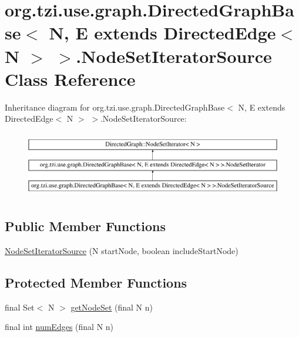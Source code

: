 \hypertarget{classorg_1_1tzi_1_1use_1_1graph_1_1_directed_graph_base_3_01_n_00_01_e_01extends_01_directed_edg13245e53183027847904400cecaf7471}{\section{org.\-tzi.\-use.\-graph.\-Directed\-Graph\-Base$<$ N, E extends Directed\-Edge$<$ N $>$ $>$.Node\-Set\-Iterator\-Source Class Reference}
\label{classorg_1_1tzi_1_1use_1_1graph_1_1_directed_graph_base_3_01_n_00_01_e_01extends_01_directed_edg13245e53183027847904400cecaf7471}
}
Inheritance diagram for org.\-tzi.\-use.\-graph.\-Directed\-Graph\-Base$<$ N, E extends Directed\-Edge$<$ N $>$ $>$.Node\-Set\-Iterator\-Source\-:\begin{figure}[H]
\begin{center}
\leavevmode
\includegraphics[height=2.911612cm]{classorg_1_1tzi_1_1use_1_1graph_1_1_directed_graph_base_3_01_n_00_01_e_01extends_01_directed_edg13245e53183027847904400cecaf7471}
\end{center}
\end{figure}
\subsection*{Public Member Functions}
\begin{DoxyCompactItemize}
\item 
\hyperlink{classorg_1_1tzi_1_1use_1_1graph_1_1_directed_graph_base_3_01_n_00_01_e_01extends_01_directed_edg13245e53183027847904400cecaf7471_a61f16cd077c0a82c90a4c4492294d97b}{Node\-Set\-Iterator\-Source} (N start\-Node, boolean include\-Start\-Node)
\end{DoxyCompactItemize}
\subsection*{Protected Member Functions}
\begin{DoxyCompactItemize}
\item 
final Set$<$ N $>$ \hyperlink{classorg_1_1tzi_1_1use_1_1graph_1_1_directed_graph_base_3_01_n_00_01_e_01extends_01_directed_edg13245e53183027847904400cecaf7471_ac4de39f10339f404d2b639bd019da391}{get\-Node\-Set} (final N n)
\item 
final int \hyperlink{classorg_1_1tzi_1_1use_1_1graph_1_1_directed_graph_base_3_01_n_00_01_e_01extends_01_directed_edg13245e53183027847904400cecaf7471_a097f5e1dc26f70368d7f72379baa3d68}{num\-Edges} (final N n)
\end{DoxyCompactItemize}


